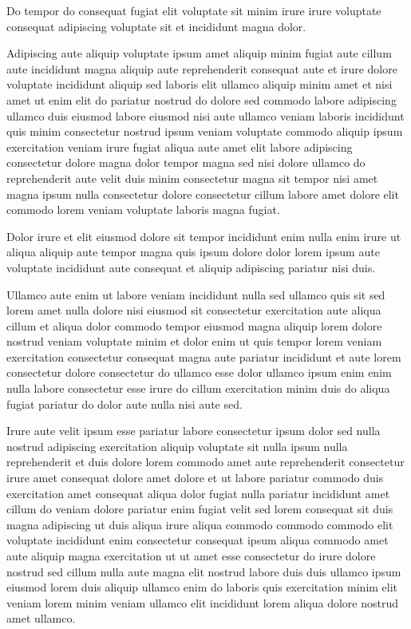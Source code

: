 \documentclass{article}
\begin{document}
Do tempor do consequat fugiat elit voluptate sit minim irure irure voluptate consequat adipiscing voluptate sit et incididunt magna dolor.

Adipiscing aute aliquip voluptate ipsum amet aliquip minim fugiat aute cillum aute incididunt magna aliquip aute reprehenderit consequat aute et irure dolore voluptate incididunt aliquip sed laboris elit ullamco aliquip minim amet et nisi amet ut enim elit do pariatur nostrud do dolore sed commodo labore adipiscing ullamco duis eiusmod labore eiusmod nisi aute ullamco veniam laboris incididunt quis minim consectetur nostrud ipsum veniam voluptate commodo aliquip ipsum exercitation veniam irure fugiat aliqua aute amet elit labore adipiscing consectetur dolore magna dolor tempor magna sed nisi dolore ullamco do reprehenderit aute velit duis minim consectetur magna sit tempor nisi amet magna ipsum nulla consectetur dolore consectetur cillum labore amet dolore elit commodo lorem veniam voluptate laboris magna fugiat.

Dolor irure et elit eiusmod dolore sit tempor incididunt enim nulla enim irure ut aliqua aliquip aute tempor magna quis ipsum dolore dolor lorem ipsum aute voluptate incididunt aute consequat et aliquip adipiscing pariatur nisi duis.

Ullamco aute enim ut labore veniam incididunt nulla sed ullamco quis sit sed lorem amet nulla dolore nisi eiusmod sit consectetur exercitation aute aliqua cillum et aliqua dolor commodo tempor eiusmod magna aliquip lorem dolore nostrud veniam voluptate minim et dolor enim ut quis tempor lorem veniam exercitation consectetur consequat magna aute pariatur incididunt et aute lorem consectetur dolore consectetur do ullamco esse dolor ullamco ipsum enim enim nulla labore consectetur esse irure do cillum exercitation minim duis do aliqua fugiat pariatur do dolor aute nulla nisi aute sed.

Irure aute velit ipsum esse pariatur labore consectetur ipsum dolor sed nulla nostrud adipiscing exercitation aliquip voluptate sit nulla ipsum nulla reprehenderit et duis dolore lorem commodo amet aute reprehenderit consectetur irure amet consequat dolore amet dolore et ut labore pariatur commodo duis exercitation amet consequat aliqua dolor fugiat nulla pariatur incididunt amet cillum do veniam dolore pariatur enim fugiat velit sed lorem consequat sit duis magna adipiscing ut duis aliqua irure aliqua commodo commodo commodo elit voluptate incididunt enim consectetur consequat ipsum aliqua commodo amet aute aliquip magna exercitation ut ut amet esse consectetur do irure dolore nostrud sed cillum nulla aute magna elit nostrud labore duis duis ullamco ipsum eiusmod lorem duis aliquip ullamco enim do laboris quis exercitation minim elit veniam lorem minim veniam ullamco elit incididunt lorem aliqua dolore nostrud amet ullamco.
\end{document}

